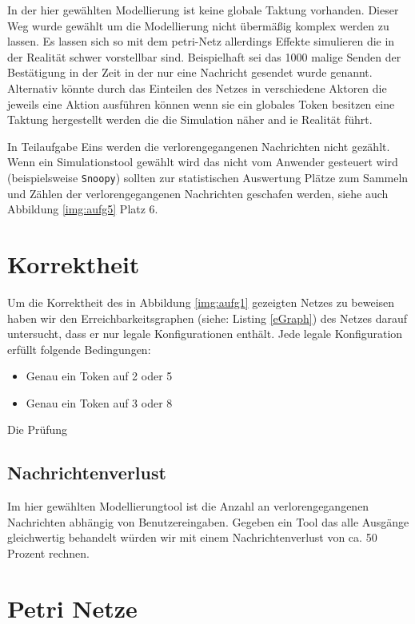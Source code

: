 \documentclass[10pt]{scrartcl}
\begin{document}
In der hier gewählten Modellierung ist keine globale Taktung vorhanden. Dieser Weg wurde gewählt um die Modellierung nicht übermäßig komplex werden zu lassen. Es lassen sich so mit dem petri-Netz allerdings Effekte simulieren die in der Realität schwer vorstellbar sind. Beispielhaft sei das 1000 malige Senden der Bestätigung in der Zeit in der nur eine Nachricht gesendet wurde genannt.   
Alternativ könnte durch das Einteilen des Netzes in verschiedene Aktoren die jeweils eine Aktion ausführen können wenn sie ein globales Token besitzen eine Taktung hergestellt werden die die Simulation näher and ie Realität führt. 

In Teilaufgabe Eins werden die verlorengegangenen Nachrichten nicht gezählt. Wenn ein Simulationstool gewählt wird das nicht vom Anwender gesteuert wird (beispielsweise \verb!Snoopy!) sollten zur statistischen Auswertung Plätze zum Sammeln und Zählen der verlorengegangenen Nachrichten geschafen werden, siehe auch Abbildung \ref{img:aufg5} Platz 6. 
	
\section{Korrektheit}
Um die Korrektheit des in Abbildung \ref{img:aufg1} gezeigten Netzes zu beweisen haben wir den Erreichbarkeitsgraphen (siehe: Listing \ref{eGraph}) des Netzes darauf untersucht, dass er nur legale Konfigurationen enthält.
Jede legale Konfiguration erfüllt folgende Bedingungen:
\begin{itemize}
	\item Genau ein Token auf 2 oder 5
	\item Genau ein Token auf 3 oder 8
\end{itemize}

Die Prüfung 



\subsection{Nachrichtenverlust}
Im hier gewählten Modellierungtool ist die Anzahl an verlorengegangenen Nachrichten abhängig von Benutzereingaben. Gegeben ein Tool das alle Ausgänge gleichwertig behandelt würden wir mit einem Nachrichtenverlust von ca. 50 Prozent rechnen.

\section{Petri Netze}
\end{document}
